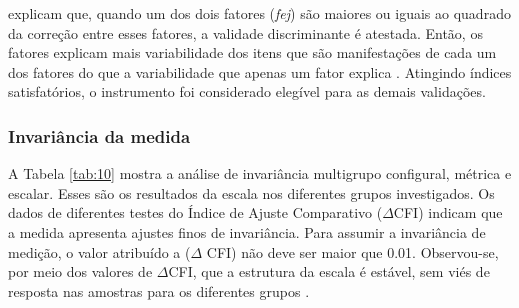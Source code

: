  explicam que, quando um dos dois fatores (\textit{fej}) são maiores ou iguais ao quadrado da correção entre esses fatores, a validade discriminante é atestada. Então, os fatores explicam mais variabilidade dos itens que são manifestações de cada um dos fatores do que a variabilidade que apenas um fator explica \cite{Borsa2018}. Atingindo índices satisfatórios, o instrumento foi considerado elegível para as demais validações.

 \subsubsection*{Invariância da medida}

A Tabela \ref{tab:10} mostra a análise de invariância multigrupo configural, métrica e escalar. Esses são os resultados da escala nos diferentes grupos investigados. Os dados de diferentes testes do Índice de Ajuste Comparativo ($\Delta$CFI) indicam que a medida apresenta ajustes finos de invariância. Para assumir a invariância de medição, o valor atribuído a ($\Delta$ CFI) não deve ser maior que 0.01. Observou-se, por meio dos valores de $\Delta$CFI, que a estrutura da escala é estável, sem viés de resposta nas amostras para os diferentes grupos \cite{Lee2020FitModel}.



\begin{table}[H]
\caption{Validade discriminante dos fatores da escala}
\centering
\label{tab:10}
\end{table}

